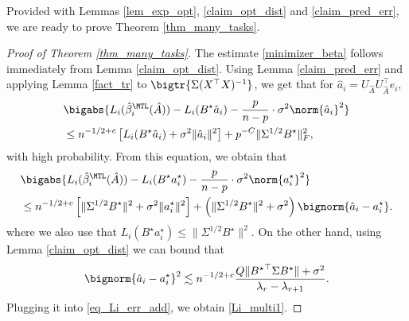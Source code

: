\documentclass[aos,preprint]{imsart}
\begin{document}
	Provided with Lemmas \ref{lem_exp_opt}, \ref{claim_opt_dist} and \ref{claim_pred_err}, we are ready to prove Theorem \ref{thm_many_tasks}.
	\begin{proof}[Proof of Theorem \ref{thm_many_tasks}]
	The estimate \eqref{minimizer_beta} follows immediately from Lemma \ref{claim_opt_dist}.
		Using Lemma \ref{claim_pred_err} and applying Lemma \ref{fact_tr} to $\bigtr{\Sigma (X^{\top}X)^{-1}}$, we get that for $\hat a_i = U_{\hat{A}} U_{\hat{A}}^{\top}e_i$,
		\begin{align}
			&\bigabs{L_i(\hat{\beta}_i^{\MTL}(\hat A)) - L_i(B^{\star} \hat {a}_i) - \frac{p }{n-p}\cdot \sigma^2 \norm{\hat {a}_i}^2}\nonumber \\
			&\le  n^{-1/2+c} \left[L_i(B^{\star} \hat {a}_i) + \sigma^2 \| \hat a_i\|^2\right] + p^{-C}  \|{\Sigma^{1/2} B^{\star}}\|_F^2 , \label{eq_Li_err_add0}
		\end{align}
		with high probability. From this equation, we obtain that
		\begin{align}
			& \bigabs{L_i(\hat{\beta}_i^{\MTL}(\hat A)) - L_i(B^{\star}  {a}^\star_i) - \frac{p }{n-p}\cdot \sigma^2 \norm{ {a}^\star_i}^2} \nonumber\\
			 &\le  n^{-1/2+c} \left[\|\Sigma^{1/2} B^{\star}\|^2 + \sigma^2 \|  a^\star_i\|^2\right] +\left(\| \Sigma^{1/2} B^{\star}\|^2  +\sigma^2\right)  \bignorm{\hat a_i-a_i^\star }    .\label{eq_Li_err_add}
		\end{align}
		where we also use that $L_i(B^{\star} {a}^\star_i)\le \|\Sigma^{1/2} B^{\star}\|^2$. On the other hand, using Lemma \ref{claim_opt_dist} we can bound that
		$$\bignorm{\hat a_i-a_i^\star }^2
				\lesssim  n^{-1/2+c} \frac{ Q  \|{B^{\star}}^\top\Sigma B^{\star}\| +  \sigma^2 }{\lambda_r - \lambda_{r+1} } .$$
		Plugging it into \eqref{eq_Li_err_add}, we obtain \eqref{Li_multi1}. %
		

\end{proof}
\end{document}
